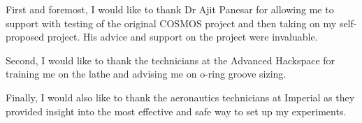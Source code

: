 First and foremost, I would like to thank Dr Ajit Panesar for allowing me to support with testing of the original COSMOS project and then taking on my self-proposed project. His advice and support on the project were invaluable. 

Second, I would like to thank the technicians at the Advanced Hackspace for training me on the lathe and advising me on o-ring groove sizing. 

Finally, I would also like to thank the aeronautics technicians at Imperial as they provided insight into the most effective and safe way to set up my experiments. 